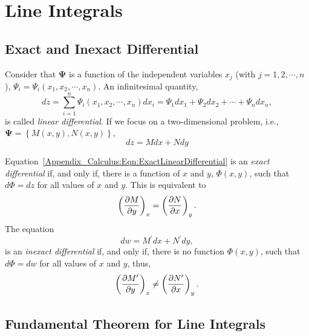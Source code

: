 \section{Line Integrals}

\subsection{Exact and Inexact Differential}
Consider that $\mathbf{\Psi}$ is a function of the independent variables $x_{j}$ (with $j=1,2,\cdots,n$),  $\Psi_{i}=\Psi_{i}\left(x_{1},x_{2},\cdots,x_{n}\right)$. An infinitesimal quantity,
   \begin{displaymath}
      dz = \sum\limits_{i=1}^{n} \Psi_{i}\left(x_{1},x_{2},\cdots,x_{n}\right) d x_{i} =  \Psi_{1} d x_{1} + \Psi_{2} d x_{2} +\cdots + \Psi_{n} d x_{n},
   \end{displaymath}
is called {\it linear differential}. If we focus on a two-dimensional problem, i.e., $\mathbf{\Psi}=\left\{M(x,y),N(x,y)\right\}$,
   \begin{equation}
      dz = M d x + N d y\label{Appendix_Calculus:Eqn:ExactLinearDifferential}
   \end{equation}

\medskip
Equation~\ref{Appendix_Calculus:Eqn:ExactLinearDifferential} is an {\it exact differential} if, and only if, there is a function of $x$ and $y$, $\Phi(x,y)$, such that $d \Phi= d z$ for all values of $x$ and $y$. This is equivalent to
   \begin{displaymath}
        \Partial[M]{y}{x} = \Partial[N]{x}{y}.
   \end{displaymath}
The equation
   \begin{equation}
      dw = M^{\prime} d x + N^{\prime} d y,\label{Appendix_Calculus:Eqn:InexactLinearDifferential}
   \end{equation}
 is an {\it inexact differential} if, and only if, there is no function $\Phi(x,y)$, such that $d \Phi = d w$ for all values of $x$ and $y$, thus,
   \begin{displaymath}
        \Partial[M^{\prime}]{y}{x} \neq \Partial[N^{\prime}]{x}{y}.
   \end{displaymath}

\subsection{Fundamental Theorem for Line Integrals}\label{Appendix_Calculus:Section:LineIntegral}

